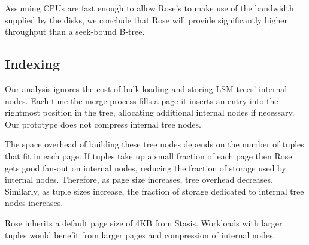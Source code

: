 \documentclass{vldb}
\newcommand{\rows}{Rose\xspace}
\newcommand{\rowss}{Rose's\xspace}
\begin{document}
Assuming CPUs are fast enough to allow \rowss to make use of the bandwidth supplied
by the disks, we conclude that \rows will provide significantly higher
throughput than a seek-bound B-tree.

\subsection{Indexing}

Our analysis ignores the cost of bulk-loading and storing
LSM-trees' internal nodes.  Each time the merge process fills a page it
inserts an entry into the rightmost position in the tree, allocating
additional internal nodes if necessary.  Our prototype does not
compress internal tree nodes.

The space overhead of building these tree nodes depends on the number
of tuples that fit in each page.  If tuples take up a small fraction
of each page then \rows gets good fan-out on internal nodes, reducing
the fraction of storage used by internal nodes.  Therefore, as page
size increases, tree overhead decreases.  Similarly, as tuple sizes
increase, the fraction of storage dedicated to internal tree nodes
increases.

\rows inherits a default page size of 4KB from Stasis.  Workloads with
larger tuples would benefit from larger pages and compression of
internal nodes.


\end{document}
